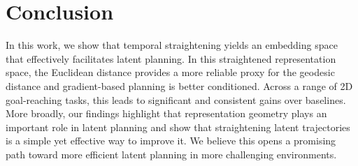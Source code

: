 \begin{table}
  \centering
  \caption{Longer-Horizon Success Rate (\%) w/ Spatial Features.}
  \label{tab:long_horizon}
  \setlength{\tabcolsep}{5pt}
  \renewcommand{\arraystretch}{1.08}
  \vspace{-0.1in}
\end{table}

\section{Conclusion}
In this work, we show that temporal straightening yields an embedding space that effectively facilitates latent planning. In this straightened representation space, the Euclidean distance provides a more reliable proxy for the geodesic distance and gradient-based planning is better conditioned. Across a range of 2D goal-reaching tasks, this leads to significant and consistent gains over baselines. More broadly, our findings highlight that representation geometry plays an important role in latent planning and show that straightening latent trajectories is a simple yet effective way to improve it. We believe this opens a promising path toward more efficient latent planning in more challenging environments.